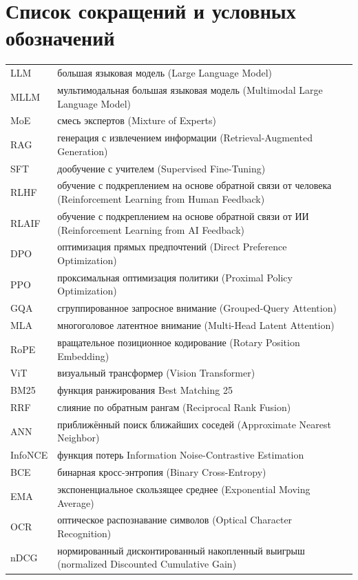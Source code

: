 \chapter*{Список сокращений и условных обозначений}

\begin{longtable}{@{}p{}p{}@{}}
LLM     & большая языковая модель (Large Language Model) \\
MLLM    & мультимодальная большая языковая модель (Multimodal Large Language Model) \\
MoE     & смесь экспертов (Mixture of Experts) \\
RAG     & генерация с извлечением информации (Retrieval-Augmented Generation) \\
SFT     & дообучение с учителем (Supervised Fine-Tuning) \\
RLHF    & обучение с подкреплением на основе обратной связи от человека (Reinforcement Learning from Human Feedback) \\
RLAIF   & обучение с подкреплением на основе обратной связи от ИИ (Reinforcement Learning from AI Feedback) \\
DPO     & оптимизация прямых предпочтений (Direct Preference Optimization) \\
PPO     & проксимальная оптимизация политики (Proximal Policy Optimization) \\
GQA     & сгруппированное запросное внимание (Grouped-Query Attention) \\
MLA     & многоголовое латентное внимание (Multi-Head Latent Attention) \\
RoPE    & вращательное позиционное кодирование (Rotary Position Embedding) \\
ViT     & визуальный трансформер (Vision Transformer) \\
BM25    & функция ранжирования Best Matching 25 \\
RRF     & слияние по обратным рангам (Reciprocal Rank Fusion) \\
ANN     & приближённый поиск ближайших соседей (Approximate Nearest Neighbor) \\
InfoNCE & функция потерь Information Noise-Contrastive Estimation \\
BCE     & бинарная кросс-энтропия (Binary Cross-Entropy) \\
EMA     & экспоненциальное скользящее среднее (Exponential Moving Average) \\
OCR     & оптическое распознавание символов (Optical Character Recognition) \\
nDCG    & нормированный дисконтированный накопленный выигрыш (normalized Discounted Cumulative Gain) \\
\end{longtable}

